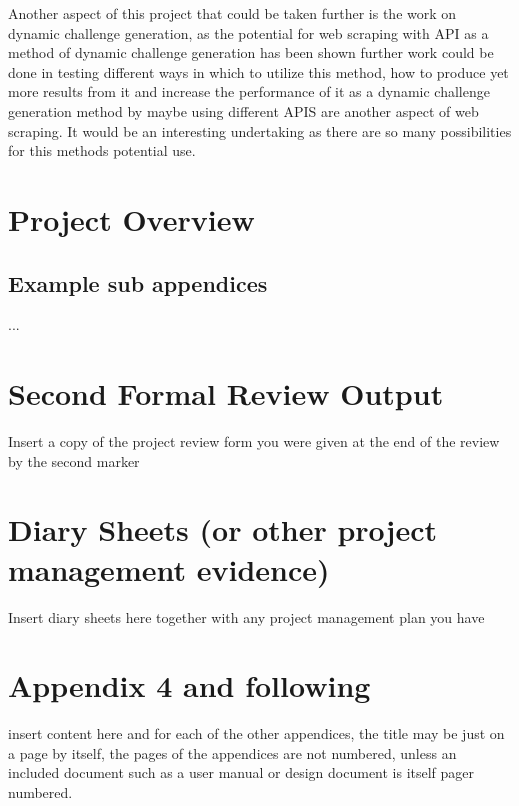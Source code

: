 \documentclass[12pt,a4paper]{article}
\begin{document}
Another aspect of this project that could be taken further is the work on dynamic challenge generation, as the potential for web scraping with API as a method of dynamic challenge generation has been shown further work could be done in testing different ways in which to utilize this method, how to produce yet more results from it and increase the performance of it as a dynamic challenge generation method by maybe using different APIS are another aspect of web scraping. It would be an interesting undertaking as there are so many possibilities for this methods potential use.

\newpage



\newpage
\begin{appendices}
\section{Project Overview}

\begin{subappendices}
\subsection{Example sub appendices}
...
\end{subappendices}

\section{Second Formal Review Output}
Insert a copy of the project review form you were given at the end of the review by the second marker

\section{Diary Sheets (or other project management evidence)}
Insert diary sheets here together with any project management plan you have

\section{Appendix 4 and following}
insert content here and for each of the other appendices, the title may be just on a page by itself, the pages of the appendices are not numbered, unless an included document such as a user manual or design document is itself pager numbered.
\end{appendices}
\end{document}
